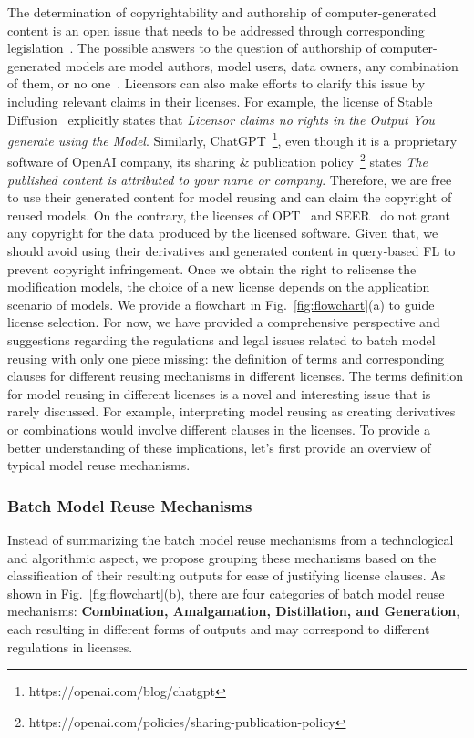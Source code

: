 The determination of copyrightability and authorship of computer-generated content is an open issue that needs to be addressed through corresponding legislation~\cite{national1979final, hedrick2019ithink, margoni2018artificial}.
The possible answers to the question of authorship of computer-generated models are model authors, model users, data owners, any combination of them, or no one~\cite{hedrick2019ithink}.
Licensors can also make efforts to clarify this issue by including relevant claims in their licenses.
For example, the license of Stable Diffusion~\cite{rombach2022high} explicitly states that \textit{Licensor claims no rights in the Output You generate using the Model}. 
Similarly, ChatGPT~\footnote{https://openai.com/blog/chatgpt}, even though it is a proprietary software of OpenAI company, its sharing \& publication policy~\footnote{https://openai.com/policies/sharing-publication-policy} states \textit{The published content is attributed to your name or company}.
Therefore, we are free to use their generated content for model reusing and can claim the copyright of reused models.
On the contrary, the licenses of OPT~\cite{zhang2022opt} and SEER~\cite{goyal2022vision} do not grant any copyright for the data produced by the licensed software. 
Given that, we should avoid using their derivatives and generated content in query-based FL to prevent copyright infringement.
Once we obtain the right to relicense the modification models, the choice of a new license depends on the application scenario of models. 
We provide a flowchart in Fig.~\ref{fig:flowchart}(a) to guide license selection.
For now, we have provided a comprehensive perspective and suggestions regarding the regulations and legal issues related to batch model reusing with only one piece missing: the definition of terms and corresponding clauses for different reusing mechanisms in different licenses.
The terms definition for model reusing in different licenses is a novel and interesting issue that is rarely discussed. 
For example, interpreting model reusing as creating derivatives or combinations would involve different clauses in the licenses.
To provide a better understanding of these implications, let's first provide an overview of typical model reuse mechanisms.

\subsubsection{Batch Model Reuse Mechanisms}
\label{sec:taxonomy}
Instead of summarizing the batch model reuse mechanisms from a technological and algorithmic aspect, we propose grouping these mechanisms based on the classification of their resulting outputs for ease of justifying license clauses.
As shown in Fig.~\ref{fig:flowchart}(b), there are four categories of batch model reuse mechanisms: \textbf{Combination, Amalgamation, Distillation, and Generation}, each resulting in different forms of outputs and may correspond to different regulations in licenses.

